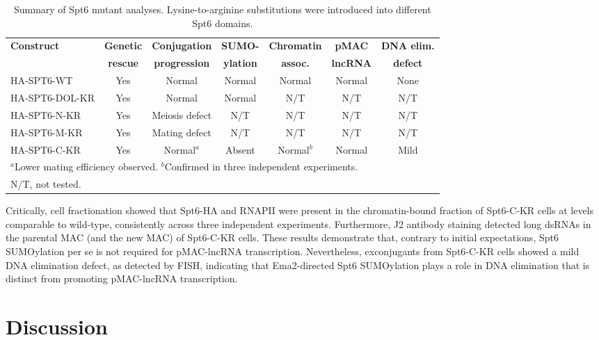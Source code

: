 \documentclass[12pt]{article}
\begin{document}
\begin{table}[htbp]
\centering
\caption{Summary of Spt6 mutant analyses. Lysine-to-arginine substitutions were introduced into different Spt6 domains.}
\label{tab:spt6_mutants}
\begin{tabular}{lcccccc}
\toprule
\textbf{Construct} & \textbf{Genetic} & \textbf{Conjugation} & \textbf{SUMO-} & \textbf{Chromatin} & \textbf{pMAC} & \textbf{DNA elim.} \\
 & \textbf{rescue} & \textbf{progression} & \textbf{ylation} & \textbf{assoc.} & \textbf{lncRNA} & \textbf{defect} \\
\midrule
HA-SPT6-WT & Yes & Normal & Normal & Normal & Normal & None \\
HA-SPT6-DOL-KR & Yes & Normal & Normal & N/T & N/T & N/T \\
HA-SPT6-N-KR & Yes & Meiosis defect & N/T & N/T & N/T & N/T \\
HA-SPT6-M-KR & Yes & Mating defect & N/T & N/T & N/T & N/T \\
HA-SPT6-C-KR & Yes & Normal$^{a}$ & Absent & Normal$^{b}$ & Normal & Mild \\
\bottomrule
\multicolumn{7}{l}{\footnotesize $^{a}$Lower mating efficiency observed. $^{b}$Confirmed in three independent experiments.} \\
\multicolumn{7}{l}{\footnotesize N/T, not tested.}
\end{tabular}
\end{table}

Critically, cell fractionation showed that Spt6-HA and RNAPII were present in the chromatin-bound fraction of Spt6-C-KR cells at levels comparable to wild-type, consistently across three independent experiments.
Furthermore, J2 antibody staining detected long dsRNAs in the parental MAC (and the new MAC) of Spt6-C-KR cells.
These results demonstrate that, contrary to initial expectations, Spt6 SUMOylation per se is not required for pMAC-lncRNA transcription.
Nevertheless, exconjugants from Spt6-C-KR cells showed a mild DNA elimination defect, as detected by FISH, indicating that Ema2-directed Spt6 SUMOylation plays a role in DNA elimination that is distinct from promoting pMAC-lncRNA transcription.

\section{Discussion}
\end{document}
